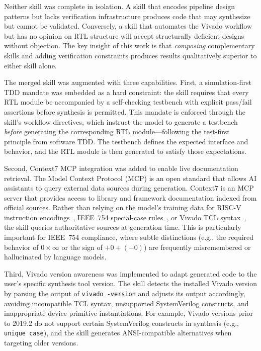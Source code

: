 \documentclass[journal]{IEEEtran}
\begin{document}
Neither skill was complete in isolation.  A skill that encodes pipeline
design patterns but lacks verification infrastructure produces code that
may synthesize but cannot be validated.  Conversely, a skill that
automates the Vivado workflow but has no opinion on RTL structure will
accept structurally deficient designs without objection.  The key insight
of this work is that \emph{composing} complementary skills and adding
verification constraints produces results qualitatively superior to
either skill alone.

The merged skill was augmented with three capabilities.  First, a
simulation-first TDD mandate was embedded as a hard constraint: the skill
requires that every RTL module be accompanied by a self-checking
testbench with explicit pass/fail assertions before synthesis is
permitted.  This mandate is enforced through the skill's workflow
directives, which instruct the model to generate a testbench
\emph{before} generating the corresponding RTL module---following the
test-first principle from software TDD.  The testbench defines the
expected interface and behavior, and the RTL module is then generated to
satisfy those expectations.

Second, Context7 MCP integration was added to enable live
documentation retrieval.  The Model Context Protocol (MCP) is an open
standard that allows AI assistants to query external data sources during
generation.  Context7 is an MCP server that provides access to
library and framework documentation indexed from official sources.
Rather than relying on the model's training data for RISC-V instruction
encodings~\cite{waterman2019riscv}, IEEE~754 special-case
rules~\cite{ieee754_2019}, or Vivado TCL
syntax~\cite{xilinx2020ug901}, the skill queries authoritative sources at
generation time.  This is particularly important for IEEE~754 compliance,
where subtle distinctions (e.g., the required behavior of $0 \times
\infty$ or the sign of $+0 + (-0)$) are frequently misremembered or
hallucinated by language models.

Third, Vivado version awareness was implemented to
adapt generated code to the user's specific synthesis tool version.  The
skill detects the installed Vivado version by parsing the output of
\texttt{vivado -version} and adjusts its output
accordingly, avoiding incompatible TCL syntax, unsupported SystemVerilog
constructs, and inappropriate device primitive instantiations.  For
example, Vivado versions prior to 2019.2 do not support certain
SystemVerilog constructs in synthesis (e.g., \texttt{unique case}), and
the skill generates ANSI-compatible alternatives when targeting older
versions.
\end{document}
